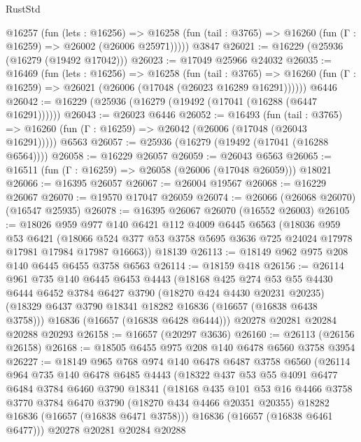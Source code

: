 \begin{lexlean}{RustStd}
\begin{coremodule}
    @16257
      (fun (lets : @16256) =>
      @16258 (fun (tail : @3765) => @16260 (fun (Γ : @16259) => @26002 (@26006 @25971)))))
    @3847
@26021 := @16229 (@25936 (@16279 (@19492 @17042)))
@26023 := @17049 @25966 @24032
@26035 := @16469
    (fun (lets : @16256) =>
    @16258
      (fun (tail : @3765) =>
      @16260 (fun (Γ : @16259) => @26021 (@26006 (@17048 (@26023 @16289 @16291))))))
    @6446
@26042 := @16229 (@25936 (@16279 (@19492 (@17041 (@16288 (@6447 @16291))))))
@26043 := @26023 @6446
@26052 := @16493
    (fun (tail : @3765) => @16260 (fun (Γ : @16259) => @26042 (@26006 (@17048 (@26043 @16291)))))
    @6563
@26057 := @25936 (@16279 (@19492 (@17041 (@16288 @6564))))
@26058 := @16229 @26057
@26059 := @26043 @6563
@26065 := @16511 (fun (Γ : @16259) => @26058 (@26006 (@17048 @26059))) @18021
@26066 := @16395 @26057
@26067 := @26004 @19567
@26068 := @16229 @26067
@26070 := @19570 @17047 @26059
@26074 := @26066 (@26068 @26070) (@16547 @25935)
@26078 := @16395 @26067 @26070 (@16552 @26003)
@26105 := @18026
    @959
    @977
    @140
    @6421
    @112
    @4009
    @6445
    @6563
    (@18036
      @959
      @53
      @6421
      (@18066 @524 @377 @53 @3758 @5695 @3636 @725 @24024 @17978 @17981 @17984 @17987 @16663))
    @18139
@26113 := @18149 @962 @975 @208 @140 @6445 @6455 @3758 @6563
@26114 := @18159 @418
@26156 := @26114
    @961
    @735
    @140
    @6445
    @6453
    @4443
    (@18168
      @425
      @274
      @53
      @55
      @4430
      @6444
      @6452
      @3784
      @6427
      @3790
      (@18270 @424 @4430 @20231 @20235)
      (@18329 @6437 @3790 @18341 @18282 @16836 (@16657 (@16838 @6438 @3758)))
      @16836
      (@16657 (@16838 @6428 @6444)))
    @20278
    @20281
    @20284
    @20288
    @20293
@26158 := @16657 (@20297 @3636)
@26160 := @26113 (@26156 @26158)
@26168 := @18505 @6455 @975 @208 @140 @6478 @6560 @3758 @3954
@26227 := @18149
    @965
    @768
    @974
    @140
    @6478
    @6487
    @3758
    @6560
    (@26114
      @964
      @735
      @140
      @6478
      @6485
      @4443
      (@18322
        @437
        @53
        @55
        @4091
        @6477
        @6484
        @3784
        @6460
        @3790
        @18341
        (@18168
          @435
          @101
          @53
          @16
          @4466
          @3758
          @3770
          @3784
          @6470
          @3790
          (@18270 @434 @4466 @20351 @20355)
          @18282
          @16836
          (@16657 (@16838 @6471 @3758)))
        @16836
        (@16657 (@16838 @6461 @6477)))
      @20278
      @20281
      @20284
      @20288

\end{coremodule}
\end{lexlean}
